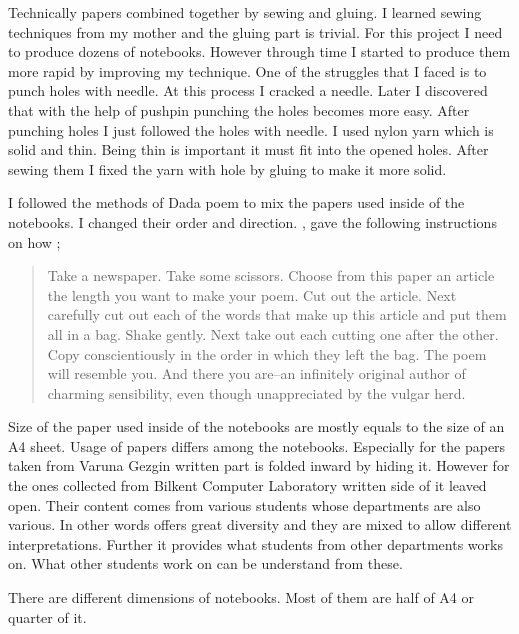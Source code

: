 Technically papers combined together by sewing and gluing. I learned sewing techniques from my mother and the gluing part is trivial. For this project I need to produce dozens of notebooks. However through time I started to produce them more rapid by improving my technique. One of the struggles that I faced is to punch holes with needle. At this process I cracked a needle. Later I discovered that with the help of pushpin punching the holes becomes more easy. After punching holes I just followed the holes with needle. I used nylon yarn which is solid and thin. Being thin is important it must fit into the opened holes. After sewing them I fixed the yarn with hole by gluing to make it more solid.

I followed the methods of Dada poem to mix the papers used inside of the notebooks. I changed their order and direction. 
\cite{tzara1977seven}, gave the following instructions on how ;

\begin{quote}
Take a newspaper. Take some scissors. Choose from this paper an article the length you want to make your poem. Cut out the article. Next carefully cut out each of the words that make up this article and put them all in a bag. Shake gently. Next take out each cutting one after the other. Copy conscientiously in the order in which they left the bag. The poem will resemble you. And there you are--an infinitely original author of       charming sensibility, even though unappreciated by the vulgar herd.
\end{quote}


Size of the paper used inside of the notebooks are mostly equals to the size of an A4 sheet. Usage of papers differs among the notebooks. Especially for the papers taken from Varuna Gezgin written part is folded inward by hiding it. However for the ones collected from Bilkent Computer Laboratory written side of it leaved open. Their content comes from various students whose departments are also various. In other words offers great diversity and they are mixed to allow different interpretations. Further it provides what students from other departments works on. What other students work on can be understand from these.

There are different dimensions of notebooks. Most of them are half of A4 or quarter of it.

